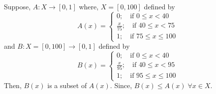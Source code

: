 \documentclass[../main-sheet.tex]{subfiles}
\begin{document}
\begin{ex}
    Suppose, \(A:X\to[0,1]\) where, \(X=[0,100]\) defined by 
    \[
        A(x)=\begin{cases}
            0;\quad \text{if }0\leq x<40\\
            \frac{x}{75};\quad \text{if }40\leq x<75\\
            1;\quad \text{if }75\leq x\leq 100
        \end{cases}
    \]
    and \(B:X=[0,100]\to[0,1]\) defined by 
    \[
        B(x)=\begin{cases}
            0;\quad \text{if }0\leq x<40\\
            \frac{x}{95};\quad \text{if }40\leq x<95\\
            1;\quad \text{if }95\leq x\leq 100
        \end{cases}
    \]
    Then, \(B(x)\) is a subset of \(A(x)\). Since, \(B(x)\leq A(x)\;\forall x\in X\).
\end{ex}
\end{document}
